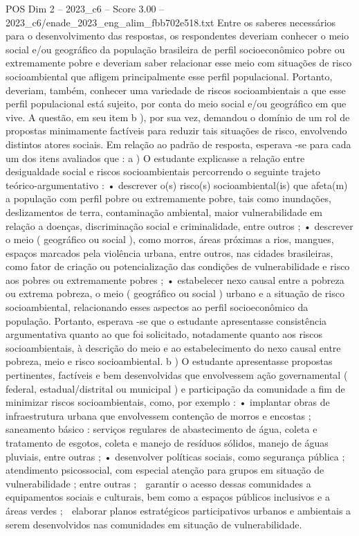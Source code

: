 \begin{textsample}{POS Dim 2 – 2023\_c6 – Score 3.00 – 2023\_c6/enade\_2023\_eng\_alim\_fbb702e518.txt}
Entre os saberes necessários para o desenvolvimento das respostas, os respondentes deveriam conhecer o meio social e/ou geográfico da população brasileira de perfil socioeconômico pobre ou extremamente pobre e deveriam saber relacionar esse meio com situações de risco socioambiental que afligem principalmente esse perfil populacional.
Portanto, deveriam, também, conhecer uma variedade de riscos socioambientais a que esse perfil populacional está sujeito, por conta do meio social e/ou geográfico em que vive.
A questão, em seu item b ), por sua vez, demandou o domínio de um rol de propostas minimamente factíveis para reduzir tais situações de risco, envolvendo distintos atores sociais.
Em relação ao padrão de resposta, esperava -se para cada um dos itens avaliados que : a ) O estudante explicasse a relação entre desigualdade social e riscos socioambientais percorrendo o seguinte trajeto teórico-argumentativo : • descrever o(s) risco(s) socioambiental(is) que afeta(m) a população com perfil pobre ou extremamente pobre, tais como inundações, deslizamentos de terra, contaminação ambiental, maior vulnerabilidade em relação a doenças, discriminação social e criminalidade, entre outros ; • descrever o meio ( geográfico ou social ), como morros, áreas próximas a rios, mangues, espaços marcados pela violência urbana, entre outros, nas cidades brasileiras, como fator de criação ou potencialização das condições de vulnerabilidade e risco aos pobres ou extremamente pobres ; • estabelecer nexo causal entre a pobreza ou extrema pobreza, o meio ( geográfico ou social ) urbano e a situação de risco socioambiental, relacionando esses aspectos ao perfil socioeconômico da população.
Portanto, esperava -se que o estudante apresentasse consistência argumentativa quanto ao que foi solicitado, notadamente quanto aos riscos socioambientais, à descrição do meio e ao estabelecimento do nexo causal entre pobreza, meio e risco socioambiental. b ) O estudante apresentasse propostas pertinentes, factíveis e bem desenvolvidas que envolvessem ação governamental ( federal, estadual/distrital ou municipal ) e participação da comunidade a fim de minimizar riscos socioambientais, como, por exemplo : • implantar obras de infraestrutura urbana que envolvessem contenção de morros e encostas ; saneamento básico : serviços regulares de abastecimento de água, coleta e tratamento de esgotos, coleta e manejo de resíduos sólidos, manejo de águas pluviais, entre outras ; • desenvolver políticas sociais, como segurança pública ; atendimento psicossocial, com especial atenção para grupos em situação de vulnerabilidade ; entre outras ;  garantir o acesso dessas comunidades a equipamentos sociais e culturais, bem como a espaços públicos inclusivos e a áreas verdes ;  elaborar planos estratégicos participativos urbanos e ambientais a serem desenvolvidos nas comunidades em situação de vulnerabilidade.

\end{textsample}
